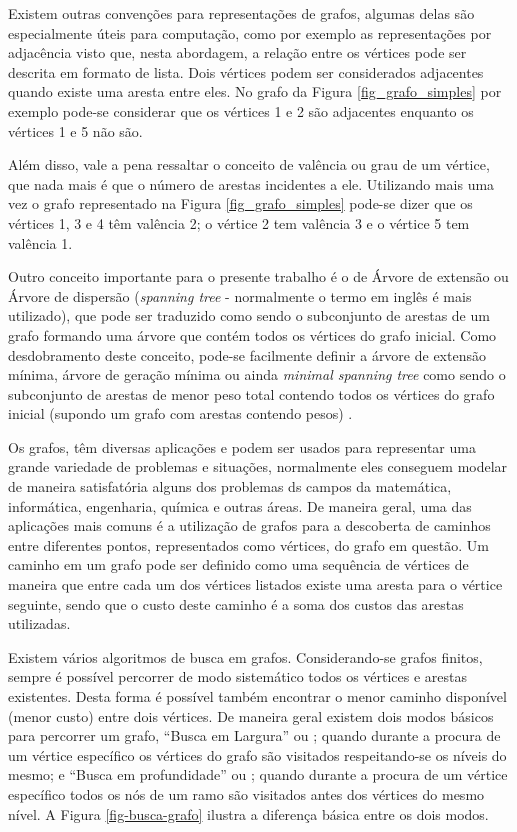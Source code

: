Existem outras convenções para representações de grafos, algumas delas são especialmente úteis para computação, como por exemplo as representações por adjacência visto que, nesta abordagem, a relação entre os vértices pode ser descrita em formato de lista. Dois vértices podem ser considerados adjacentes quando existe uma aresta entre eles. No grafo da Figura \ref{fig_grafo_simples} por exemplo pode-se considerar que os vértices 1 e 2 são adjacentes enquanto os vértices 1 e 5 não são.

Além disso, vale a pena ressaltar o conceito de valência ou grau de um vértice, que nada mais é que o número de arestas incidentes a ele. Utilizando mais uma vez o grafo representado na Figura \ref{fig_grafo_simples} pode-se dizer que os vértices 1, 3 e 4 têm valência 2; o vértice 2 tem valência 3 e o vértice 5 tem valência 1.

Outro conceito importante para o presente trabalho é o de Árvore de extensão ou Árvore de dispersão (\emph{spanning tree} - normalmente o termo em inglês é mais utilizado), que pode ser traduzido como sendo o subconjunto de arestas de um grafo formando uma árvore que contém todos os vértices do grafo inicial. Como desdobramento deste conceito, pode-se facilmente definir a árvore de extensão mínima, árvore de geração mínima ou ainda \emph{minimal spanning tree} como sendo o subconjunto de arestas de menor peso total contendo todos os vértices do grafo inicial (supondo um grafo com arestas contendo pesos) \cite{Eppstein1996}.

Os grafos, têm diversas aplicações e podem ser usados para representar uma grande variedade de problemas e situações, normalmente eles conseguem modelar de maneira satisfatória alguns dos problemas ds campos da matemática, informática, engenharia, química e outras áreas. De maneira geral, uma das aplicações mais comuns é a utilização de grafos para a descoberta de caminhos entre diferentes pontos, representados como vértices, do grafo em questão. Um caminho em um grafo pode ser definido como uma sequência de vértices de maneira que entre cada um dos vértices listados existe uma aresta para o vértice seguinte, sendo que o custo deste caminho é a soma dos custos das arestas utilizadas.

Existem vários algoritmos de busca em grafos. Considerando-se grafos finitos, sempre é possível percorrer de modo sistemático todos os vértices e arestas existentes. Desta forma é possível também encontrar o menor caminho disponível (menor custo) entre dois vértices. De maneira geral existem dois modos básicos para percorrer um grafo, ``Busca em Largura'' ou ; quando durante a procura de um vértice específico os vértices do grafo são visitados respeitando-se os níveis do mesmo;  e ``Busca em profundidade'' ou ; quando durante a procura de um vértice específico todos os nós de um ramo são visitados antes dos vértices do mesmo nível. A Figura \ref{fig-busca-grafo} ilustra a diferença básica entre os dois modos.

